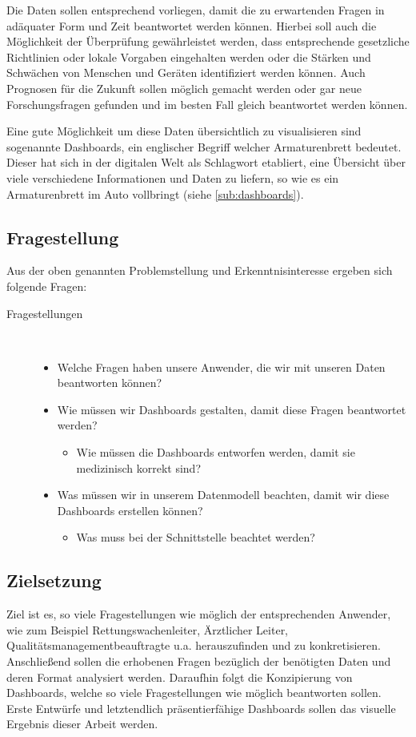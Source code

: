 Die Daten sollen entsprechend vorliegen, damit die zu erwartenden Fragen in adäquater Form und Zeit beantwortet werden können.
Hierbei soll auch die Möglichkeit der Überprüfung gewährleistet werden, dass entsprechende gesetzliche Richtlinien \cite{Maconochie.2015} oder lokale Vorgaben eingehalten werden oder die Stärken und Schwächen von Menschen und Geräten identifiziert werden können.
Auch Prognosen für die Zukunft sollen möglich gemacht werden oder gar neue Forschungsfragen gefunden  und im besten Fall gleich beantwortet werden können.

Eine gute Möglichkeit um diese Daten übersichtlich zu visualisieren sind sogenannte \glqq \gls{Dashboard}s\grqq, ein englischer Begriff welcher \glqq Armaturenbrett\grqq{} bedeutet.
Dieser hat sich in der digitalen Welt als Schlagwort etabliert, eine Übersicht über viele verschiedene Informationen und Daten zu liefern, so wie es ein Armaturenbrett im Auto vollbringt (siehe \ref{sub:dashboards}).

\subsection{Fragestellung}
\label{fragen}
Aus der oben genannten Problemstellung und Erkenntnisinteresse ergeben sich folgende Fragen:
\begin{description}
\item[Fragestellungen]~\par
\begin{itemize}
      \item Welche Fragen haben unsere Anwender, die wir mit unseren Daten beantworten können?    
      \item Wie müssen wir Dashboards gestalten, damit diese Fragen beantwortet werden?
      \begin{itemize}
        \item Wie müssen die Dashboards entworfen werden, damit sie medizinisch korrekt sind?  
      \end{itemize}
      \item Was müssen wir in unserem Datenmodell beachten, damit wir diese Dashboards erstellen 					können?
      \begin{itemize}
        \item Was muss bei der Schnittstelle beachtet werden?
      \end{itemize}
\end{itemize}
\end{description}

\subsection{Zielsetzung}
\label{ziel}
Ziel ist es, so viele Fragestellungen wie möglich der entsprechenden Anwender, wie zum Beispiel Rettungswachenleiter, Ärztlicher Leiter, Qualitätsmanagementbeauftragte u.a. herauszufinden und zu konkretisieren.
Anschließend sollen die erhobenen Fragen bezüglich der benötigten Daten und deren Format analysiert werden.
Daraufhin folgt die Konzipierung von Dashboards, welche so viele Fragestellungen wie möglich beantworten sollen.
Erste Entwürfe und letztendlich präsentierfähige Dashboards sollen das visuelle Ergebnis dieser
Arbeit werden.

